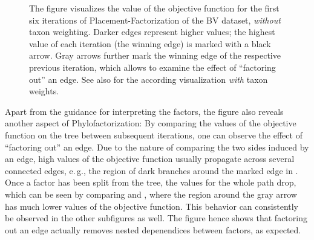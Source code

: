 \begin{figure}[!htb]
{%
        The figure visualizes the value of the objective function for the first six iterations of
        Placement-Factorization of the \ac{BV} dataset, \emph{without} taxon weighting.
        Darker edges represent higher values;
        the highest value of each iteration (the winning edge) is marked with a black arrow.
        Gray arrows further mark the winning edge of the respective previous iteration,
        which allows to examine the effect of ``factoring out'' an edge.
        See also  for the according visualization \emph{with} taxon weights.
    }
    \label{fig:pf_bv_place_no_tw_ovs}
\end{figure}

Apart from the guidance for interpreting the factors, the figure also reveals another aspect of Phylofactorization:
By comparing the values of the objective function on the tree between subsequent iterations,
one can observe the effect of ``factoring out'' an edge.
Due to the nature of comparing the two sides induced by an edge,
high values of the objective function usually propagate across several connected edges,
e.\,g., the region of dark branches around the marked edge in .
Once a factor has been split from the tree, the values for the whole path drop,
which can be seen by comparing 
and ,
where the region around the gray arrow has much lower values of the objective function.
This behavior can consistently be observed in the other subfigures as well.
The figure hence shows that factoring out an edge actually removes nested depenendices between factors, as expected.


